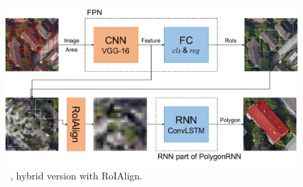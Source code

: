 \begin{figure}[!h]
	\centering
	\includegraphics[width=\fig\textwidth]{3-17.pdf}
    \caption[\modelnameshort\ , hybrid version with RoIAlign.]{\modelnameshort\ , hybrid version with RoIAlign.}
    \label{fig:algmod}
\end{figure}